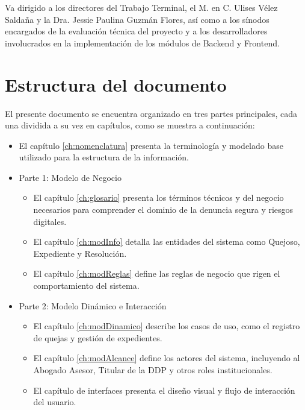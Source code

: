         Va dirigido a los directores del Trabajo Terminal, el M. en C. Ulises Vélez Saldaña y la Dra. Jessie Paulina Guzmán Flores, así como a los sínodos encargados de la evaluación técnica del proyecto y a los desarrolladores involucrados en la implementación de los módulos de Backend y Frontend.

    \section{Estructura del documento}

        El presente documento se encuentra organizado en tres partes principales, cada una dividida a su vez en capítulos, como se muestra a continuación:

        \begin{itemize}
            \item El capítulo \ref{ch:nomenclatura} presenta la terminología y modelado base utilizado para la estructura de la información.
            \item Parte 1: Modelo de Negocio
                \begin{itemize}
                    \item El capítulo \ref{ch:glosario} presenta los términos técnicos y del negocio necesarios para comprender el dominio de la denuncia segura y riesgos digitales.
                    \item El capítulo \ref{ch:modInfo} detalla las entidades del sistema como Quejoso, Expediente y Resolución.
                    \item El capítulo \ref{ch:modReglas} define las reglas de negocio que rigen el comportamiento del sistema.
                \end{itemize}
            \item Parte 2: Modelo Dinámico e Interacción
                \begin{itemize}
                    \item El capítulo \ref{ch:modDinamico} describe los casos de uso, como el registro de quejas y gestión de expedientes.
                    \item El capítulo \ref{ch:modAlcance} define los actores del sistema, incluyendo al Abogado Asesor, Titular de la DDP y otros roles institucionales.
                    \item El capítulo de interfaces presenta el diseño visual y flujo de interacción del usuario.
                \end{itemize}
        \end{itemize}
    
